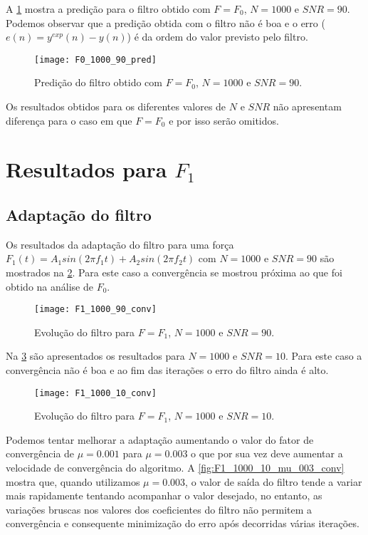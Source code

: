 A \cref{fig:F0_1000_90_pred} mostra a predição para o filtro obtido com $ F=F_0 $, $ N=1000 $ e $ SNR=90 $. Podemos observar que a predição obtida com o filtro não é boa e o erro ($ e(n)=y^{exp}(n) - y(n) $) é da ordem do valor previsto pelo filtro.

\begin{figure}[h]
	\centering
	\texttt{[image: F0\_1000\_90\_pred]}
	\caption{Predição do filtro obtido com $ F=F_0 $, $ N=1000 $ e $ SNR=90 $.}
	\label{fig:F0_1000_90_pred}
\end{figure}

Os resultados obtidos para os diferentes valores de $ N $ e $ SNR $ não apresentam diferença para o caso em que $ F=F_0 $ e por isso serão omitidos.

\section{Resultados para $ F_1 $}
\subsection{Adaptação do filtro}\label{adapt_F_1}

Os resultados da adaptação do filtro para uma força $F_1(t) = A_1 sin(2\pi f_1 t) + A_2 sin(2\pi f_2 t)$  com $ N=1000 $  e $ SNR = 90 $ são mostrados na \cref{fig:F1_1000_90_conv}. Para este caso a convergência se mostrou próxima ao que foi obtido na análise de $ F_0 $. 

\begin{figure}
	\centering
	\texttt{[image: F1\_1000\_90\_conv]}
	\caption{Evolução do filtro para $ F=F_1 $, $ N=1000 $ e $ SNR=90 $.}
	\label{fig:F1_1000_90_conv}
\end{figure}

Na \cref{fig:F1_1000_10_conv} são apresentados os resultados para $ N=1000 $ e $ SNR=10 $. Para este caso a convergência não é boa e ao fim das iterações o erro do filtro ainda é alto. 

\begin{figure}
	\centering
	\texttt{[image: F1\_1000\_10\_conv]}
	\caption{Evolução do filtro para $ F=F_1 $, $ N=1000 $ e $ SNR=10 $.}
	\label{fig:F1_1000_10_conv}
\end{figure}

Podemos tentar melhorar a adaptação aumentando o valor do fator de convergência de $ \mu=0.001 $ para $ \mu=0.003 $ o que por sua vez deve aumentar a velocidade de convergência do algoritmo. A \cref{fig:F1_1000_10_mu_003_conv} mostra que, quando utilizamos $ \mu = 0.003 $, o valor de saída do filtro tende a variar mais rapidamente tentando acompanhar o valor desejado, no entanto, as variações bruscas nos valores dos coeficientes do filtro não permitem a convergência e consequente minimização do erro após decorridas várias iterações. 

